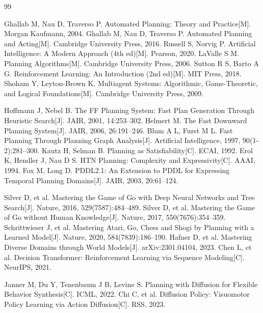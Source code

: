 \documentclass[a4paper,12pt,openany]{ctexbook}
\theoremstyle{definition}
\theoremstyle{plain}
\begin{document}
\begin{thebibliography}{99}

 Ghallab M, Nau D, Traverso P. Automated Planning: Theory and Practice[M]. Morgan Kaufmann, 2004.
 Ghallab M, Nau D, Traverso P. Automated Planning and Acting[M]. Cambridge University Press, 2016.
 Russell S, Norvig P. Artificial Intelligence: A Modern Approach (4th ed)[M]. Pearson, 2020.
 LaValle S M. Planning Algorithms[M]. Cambridge University Press, 2006.
 Sutton R S, Barto A G. Reinforcement Learning: An Introduction (2nd ed)[M]. MIT Press, 2018.
 Shoham Y, Leyton-Brown K. Multiagent Systems: Algorithmic, Game-Theoretic, and Logical Foundations[M]. Cambridge University Press, 2009.

 Hoffmann J, Nebel B. The FF Planning System: Fast Plan Generation Through Heuristic Search[J]. JAIR, 2001, 14:253--302.
 Helmert M. The Fast Downward Planning System[J]. JAIR, 2006, 26:191--246.
 Blum A L, Furst M L. Fast Planning Through Planning Graph Analysis[J]. Artificial Intelligence, 1997, 90(1-2):281--300.
 Kautz H, Selman B. Planning as Satisfiability[C]. ECAI, 1992.
 Erol K, Hendler J, Nau D S. HTN Planning: Complexity and Expressivity[C]. AAAI, 1994.
 Fox M, Long D. PDDL2.1: An Extension to PDDL for Expressing Temporal Planning Domains[J]. JAIR, 2003, 20:61--124.

 Silver D, et al. Mastering the Game of Go with Deep Neural Networks and Tree Search[J]. Nature, 2016, 529(7587):484--489.
 Silver D, et al. Mastering the Game of Go without Human Knowledge[J]. Nature, 2017, 550(7676):354--359.
 Schrittwieser J, et al. Mastering Atari, Go, Chess and Shogi by Planning with a Learned Model[J]. Nature, 2020, 584(7839):186--190.
 Hafner D, et al. Mastering Diverse Domains through World Models[J]. arXiv:2301.04104, 2023.
 Chen L, et al. Decision Transformer: Reinforcement Learning via Sequence Modeling[C]. NeurIPS, 2021.

 Janner M, Du Y, Tenenbaum J B, Levine S. Planning with Diffusion for Flexible Behavior Synthesis[C]. ICML, 2022.
 Chi C, et al. Diffusion Policy: Visuomotor Policy Learning via Action Diffusion[C]. RSS, 2023.


\end{thebibliography}
\end{document}

